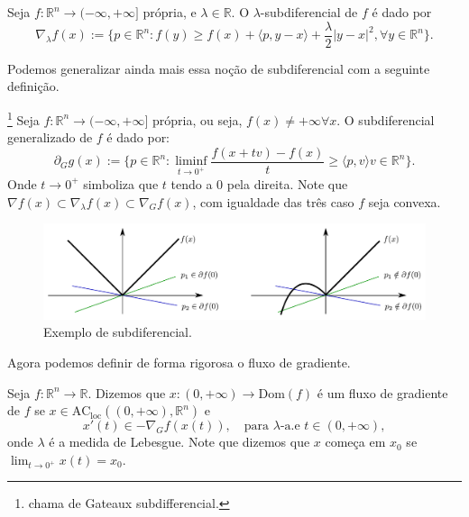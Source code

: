 \begin{definition}
    Seja $f:\mathbb R^n \to (-\infty, +\infty]$ própria, e $\lambda \in \mathbb R$.
    O $\lambda$-subdiferencial de $f$ é dado por
    \begin{equation}
        \nabla_\lambda f(x) := \{
            p \in \mathbb R^n: f(y) \geq f(x) + \langle p, y-x\rangle
            + \frac{\lambda}{2}|y-x|^2, \forall y \in \mathbb R^n\}.
    \end{equation}
\end{definition}

Podemos generalizar ainda mais essa noção de subdiferencial com a seguinte definição.
\begin{definition}
    \footnote{\citet{ambrosio2021lectures} chama de Gateaux subdifferencial.}
    Seja $f:\mathbb R^n \to (-\infty, +\infty]$ própria, ou seja, $f(x) \neq +\infty \forall x$.
    O subdiferencial generalizado de $f$ é dado por:
    \begin{equation}
        \partial_G g(x):= \{p \in \mathbb R^n: \liminf_{t\to 0^+}\frac{f(x+tv) - f(x)}{t}
        \geq \langle p,v \rangle v \in \mathbb R^n\}.
    \end{equation}
    Onde $t \to 0^+$ simboliza que $t$ tendo a $0$ pela direita.
    Note que $\nabla f(x)\subset \nabla_\lambda f(x) \subset \nabla_G f(x)$, com igualdade
    das três caso $f$ seja convexa.
\end{definition}

\begin{figure}[H]
    \includegraphics[width=1\textwidth]{./Figures/subdiferencial}
    \caption{Exemplo de subdiferencial.}
    \label{fig:subdiferencial}
\end{figure}

Agora podemos definir de forma rigorosa o fluxo de gradiente.

\begin{definition}
    Seja $f:\mathbb R^n \to \mathbb R$.
    Dizemos que $x:(0,+\infty) \to \text{Dom}(f)$ é um fluxo de gradiente
    de $f$ se $x \in \text{AC}_{\text{loc}}((0,+\infty), \mathbb R^n)$ e
    \begin{equation}
        x'(t) \in - \nabla_G f(x(t)), \quad \text{para } \lambda\text{-a.e } t \in (0,+\infty),
    \end{equation}
    onde $\lambda$ é a medida de Lebesgue. Note que dizemos que $x$ começa em $x_0$ se
    $\lim_{t \to 0^+} x(t) = x_0$.
\end{definition}